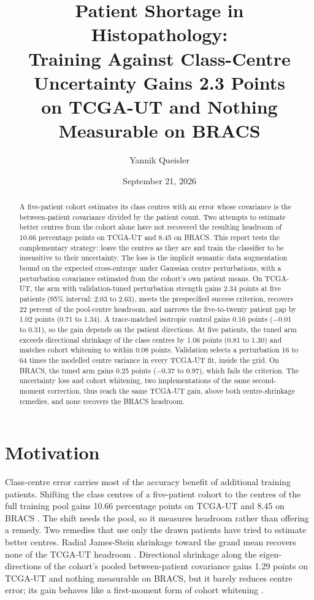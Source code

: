 \documentclass[11pt]{article}
\title{Patient Shortage in Histopathology:\\Training Against Class-Centre Uncertainty Gains 2.3 Points\\on TCGA-UT and Nothing Measurable on BRACS}
\author{Yannik Queisler}
\date{September 21, 2026}
\begin{document}
\raggedbottom
{}
\setlength{\emergencystretch}{2em}
\maketitle
\begin{abstract}
\noindent A five-patient cohort estimates its class centres with an error whose covariance is the between-patient covariance divided by the patient count. Two attempts to estimate better centres from the cohort alone have not recovered the resulting headroom of 10.66 percentage points on TCGA-UT and 8.45 on BRACS. This report tests the complementary strategy: leave the centres as they are and train the classifier to be insensitive to their uncertainty. The loss is the implicit semantic data augmentation bound on the expected cross-entropy under Gaussian centre perturbations, with a perturbation covariance estimated from the cohort's own patient means. On TCGA-UT, the arm with validation-tuned perturbation strength gains 2.34 points at five patients (95\% interval: 2.03 to 2.63), meets the prespecified success criterion, recovers 22 percent of the pool-centre headroom, and narrows the five-to-twenty patient gap by 1.02 points (0.71 to 1.34). A trace-matched isotropic control gains 0.16 points ($-0.01$ to 0.31), so the gain depends on the patient directions. At five patients, the tuned arm exceeds directional shrinkage of the class centres by 1.06 points (0.81 to 1.30) and matches cohort whitening to within 0.08 points. Validation selects a perturbation 16 to 64 times the modelled centre variance in every TCGA-UT fit, inside the grid. On BRACS, the tuned arm gains 0.25 points ($-0.37$ to 0.97), which fails the criterion. The uncertainty loss and cohort whitening, two implementations of the same second-moment correction, thus reach the same TCGA-UT gain, above both centre-shrinkage remedies, and none recovers the BRACS headroom.
\end{abstract}

\section{Motivation}
\label{sec:motivation}
Class-centre error carries most of the accuracy benefit of additional training patients. Shifting the class centres of a five-patient cohort to the centres of the full training pool gains 10.66 percentage points on TCGA-UT and 8.45 on BRACS \citep{queisler2026centreError,queisler2026bracsMechanism}. The shift needs the pool, so it measures headroom rather than offering a remedy. Two remedies that use only the drawn patients have tried to estimate better centres. Radial James-Stein shrinkage toward the grand mean recovers none of the TCGA-UT headroom \citep{queisler2026centreShrinkage}. Directional shrinkage along the eigen-directions of the cohort's pooled between-patient covariance gains 1.29 points on TCGA-UT and nothing measurable on BRACS, but it barely reduces centre error; its gain behaves like a first-moment form of cohort whitening \citep{queisler2026directionalShrinkage}.
\end{document}
